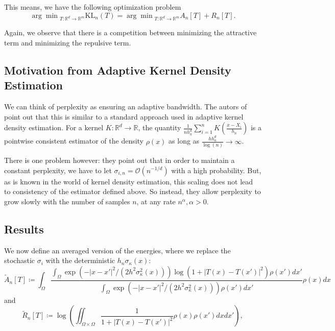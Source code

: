 This means, we have the following optimization problem
\begin{equation}
    {\arg \min}_{T: \mathbb{R}^d \to \mathbb{R}^m} \text{KL}_n (T) = {\arg \min}_{T: \mathbb{R}^d \to \mathbb{R}^m} A_n[T] + R_n[T].
\end{equation}

Again, we observe that there is a competition between minimizing the attractive term and minimizing the repulsive term. 

\subsection*{Motivation from Adaptive Kernel Density Estimation}

We can think of perplexity as ensuring an adaptive bandwidth. 
The autors of \cite{murray2024largedatalimitsscaling} point out that this is similar to a standard approach used in adaptive kernel density estimation. 
For a kernel $K: \mathbb{R}^d \to \mathbb{R}$, the quantity $\frac{1}{n h_n^d}\sum_{i=1}^n K(\frac{x-X_i}{h_n})$ is a pointwise consistent estimator of the density $\rho(x)$ as long as $\frac{h h_n^d}{\log(n)} \to \infty$. 

There is one problem however: they point out that in order to maintain a constant perplexity, we have to let $\sigma_{i,n} = \mathcal{O}(n^{-1/d})$ with a high probability. 
But, as is known in the world of kernel density estimation, this scaling does not lead to consistency of the estimator defined above. 
So instead, they allow perplexity to grow slowly with the number of samples $n$, at any rate $n^\alpha, \alpha > 0$. 

\subsection*{Results}

We now define an averaged version of the energies, where we replace the stochastic $\sigma_i$ with the deterministic $h_n \sigma_\kappa(x)$: 
\begin{equation}
    \tilde{A}_n[T] \coloneq  \int_{\Omega} \frac{\int_{\Omega} \exp(-|x - x'|^2/(2 h^2 \sigma_\kappa^2(x))) \log(1+ |T(x) - T(x')|^2) \rho(x')dx'}{\int_{\Omega} \exp(-|x - x'|^2/(2 h^2 \sigma_\kappa^2(x))) \rho(x')dx'} \rho(x)dx  
\end{equation}
and 
\begin{equation}
    \tilde{R}_n[T] \coloneq \log \left( \iint_{\Omega \times \Omega} \frac{1}{1+ |T(x) - T(x')|^2} \rho(x) \rho(x')dx dx' \right), 
\end{equation}

